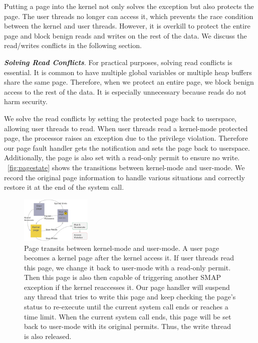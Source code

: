 Putting a page into the kernel not only solves the exception but also protects the page. The user threads no longer can access it, which prevents the race condition between the kernel and user threads. However, it is overkill to protect the entire page and block benign reads and writes on the rest of the data. We discuss the read/writes conflicts in the following section.



\textbf{\textit{Solving Read Conflicts}}. For practical purposes, solving
read conflicts is essential. It is common to have multiple global
variables or multiple heap buffers share the same page. Therefore, when we protect an entire page, we block benign access to the rest of the data. It is especially unnecessary because reads do not harm security.

We solve the read conflicts by setting the protected page
back to userspace, allowing user threads to read. When user threads read a kernel-mode protected page, the processor raises an exception due to the privilege violation. Therefore our page fault handler gets the notification and sets the page back to userspace. Additionally, the page is also set with a read-only permit to ensure no write. ~\autoref{fig:pagestate} shows the transitions between kernel-mode and user-mode.  We record the original page information to handle various situations and correctly restore it at the end of the system call.


\begin{figure}[th]
  \includegraphics[width=0.30\textwidth]{figures/pagestate}
  \centering
  \caption{Page transits between kernel-mode and user-mode. A user page becomes a kernel page after the kernel access it. If user threads read this page, we change it back to user-mode with a read-only permit. Then this page is also then capable of triggering another SMAP exception if the kernel reaccesses it. Our page handler will suspend any thread that tries to write this page and keep checking the page's status to re-execute until the current system call ends or reaches a time limit. When the current system call ends, this page will be set back to user-mode with its original permits. Thus, the write thread is also released. }
  \label{fig:pagestate}
\end{figure}



